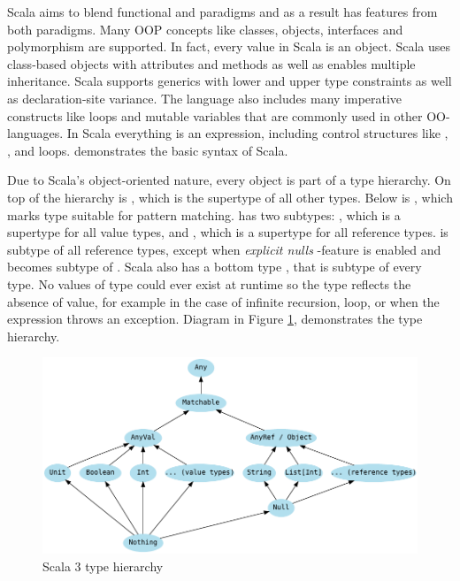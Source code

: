 Scala aims to blend functional and  paradigms and as a result has features from both paradigms. Many OOP concepts like classes, objects, interfaces and polymorphism are supported. In fact, every value in Scala is an object. Scala uses class-based objects with attributes and methods as well as enables multiple inheritance. Scala supports generics with lower and upper type constraints as well as declaration-site variance. The language also includes many imperative constructs like loops and mutable variables that are commonly used in other OO-languages. In Scala everything is an expression, including control structures like , , and loops.  demonstrates the basic syntax of Scala.




Due to Scala's object-oriented nature, every object is part of a type hierarchy. On top of the hierarchy is , which is the supertype of all other types. Below  is , which marks type suitable for pattern matching.  has two subtypes: , which is a supertype for all value types, and , which is a supertype for all reference types.  is subtype of all reference types, except when \textit{explicit nulls} -feature is enabled and  becomes subtype of . Scala also has a bottom type , that is subtype of every type. No values of type  could ever exist at runtime so the type reflects the absence of value, for example in the case of infinite recursion, loop, or when the expression throws an exception. Diagram in Figure \ref{fig:scala-type-hierarchy}, demonstrates the type hierarchy.

\begin{figure}
    \centering
    \includegraphics{images/type-hierarchy}
    \caption{Scala 3 type hierarchy}
    \label{fig:scala-type-hierarchy}
\end{figure}

